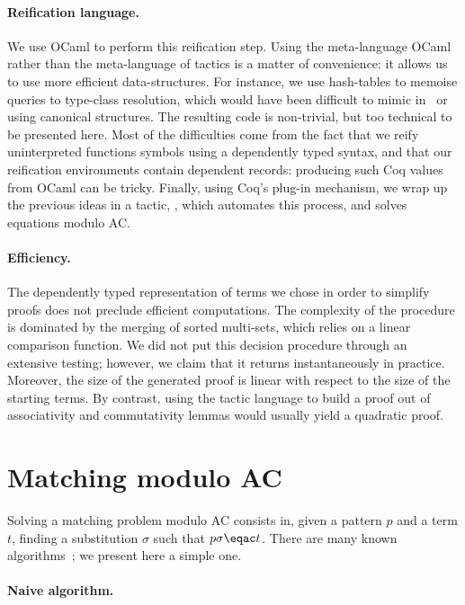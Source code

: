\documentclass{llncs}
\begin{document}
\paragraph{Reification language.} 

We use OCaml to perform this reification step. Using the meta-language
OCaml rather than the meta-language of tactics \ltac{} is a matter of
convenience: it allows us to use more efficient data-structures. For
instance, we use hash-tables to memoise queries to type-class
resolution, which would have been difficult to mimic in \ltac\ or
using canonical structures. 
The resulting code is non-trivial, but too technical to be presented
here. Most of the difficulties come from the fact that we reify
uninterpreted functions symbols using a dependently typed syntax, and
that our reification environments contain dependent records: producing
such Coq values from OCaml can be tricky.
Finally, using Coq's plug-in mechanism, we wrap up the previous ideas
in a tactic, \tac, which automates this process, and solves equations
modulo AC.

\paragraph{Efficiency.} 

The dependently typed representation of terms we chose in order to
simplify proofs does not preclude efficient computations.
The complexity of the procedure is dominated by the merging of sorted
multi-sets, which relies on a linear comparison function.
We did not put this decision procedure through an extensive testing;
however, we claim that it returns instantaneously in practice.
Moreover, the size of the generated proof is linear with respect to
the size of the starting terms. By contrast, using the tactic language
to build a proof out of associativity and commutativity lemmas would
usually yield a quadratic proof.


\section{Matching modulo AC}
\label{sec:matching}

Solving a matching problem modulo AC consists in, given a pattern $p$
and a term $t$, finding a substitution $\sigma$ such that $p\sigma
\eqac t$.  There are many known
algorithms~\cite{contejean-04,eker-02,hullot,nipkow-90}; we present
here a simple one.

\paragraph{Naive algorithm.}
\end{document}
